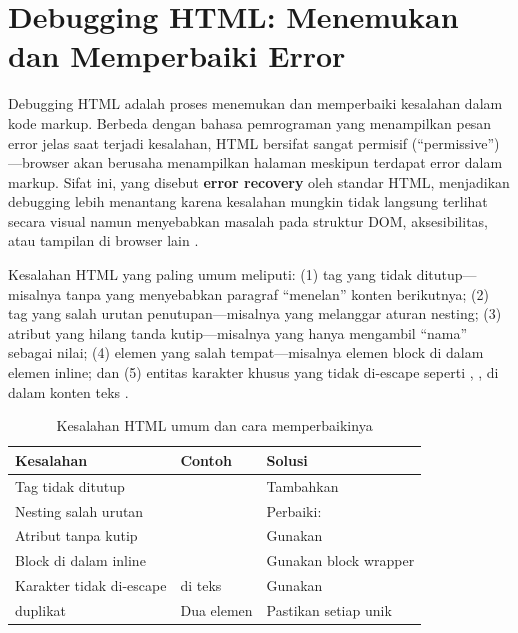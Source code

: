 \section{Debugging HTML: Menemukan dan Memperbaiki Error}

Debugging HTML adalah proses menemukan dan memperbaiki kesalahan dalam kode markup. Berbeda dengan bahasa pemrograman yang menampilkan pesan error jelas saat terjadi kesalahan, HTML bersifat sangat permisif (``permissive'')---browser akan berusaha menampilkan halaman meskipun terdapat error dalam markup. Sifat ini, yang disebut \textbf{error recovery} oleh standar HTML, menjadikan debugging lebih menantang karena kesalahan mungkin tidak langsung terlihat secara visual namun menyebabkan masalah pada struktur DOM, aksesibilitas, atau tampilan di browser lain \cite{mdnHtmlIntro}.

Kesalahan HTML yang paling umum meliputi: (1) tag yang tidak ditutup---misalnya  tanpa  yang menyebabkan paragraf ``menelan'' konten berikutnya; (2) tag yang salah urutan penutupan---misalnya  yang melanggar aturan nesting; (3) atribut yang hilang tanda kutip---misalnya  yang hanya mengambil ``nama'' sebagai nilai; (4) elemen yang salah tempat---misalnya elemen block di dalam elemen inline; dan (5) entitas karakter khusus yang tidak di-escape seperti \code{<}, \code{>}, \code{\&} di dalam konten teks \cite{whatwgHtml}.

\begin{table}[htbp]
\centering
\begin{tabular}{|P{3.5cm}|P{4cm}|P{4.5cm}|}
\hline
\textbf{Kesalahan} & \textbf{Contoh} & \textbf{Solusi} \\
\hline
Tag tidak ditutup &  & Tambahkan  \\
\hline
Nesting salah urutan &  & Perbaiki:  \\
\hline
Atribut tanpa kutip &  & Gunakan  \\
\hline
Block di dalam inline &  & Gunakan block wrapper \\
\hline
Karakter tidak di-escape &  di teks & Gunakan  \\
\hline
{} duplikat & Dua elemen  & Pastikan setiap  unik \\
\hline
\end{tabular}
\caption{Kesalahan HTML umum dan cara memperbaikinya}
\end{table}

